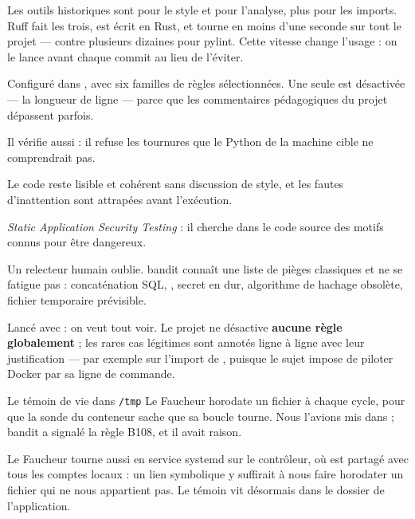 \pourquoi
Les outils historiques sont  pour le style et  pour
l'analyse, plus  pour les imports. Ruff fait les trois, est écrit en
Rust, et tourne en moins d'une seconde sur tout le projet --- contre plusieurs
dizaines pour pylint. Cette vitesse change l'usage : on le lance avant chaque
commit au lieu de l'éviter.

\role
Configuré dans , avec six familles de règles
sélectionnées. Une seule est désactivée --- la longueur de ligne --- parce que
les commentaires pédagogiques du projet dépassent parfois.

Il vérifie aussi  : il refuse les tournures que le
Python de la machine cible ne comprendrait pas.

\apport
Le code reste lisible et cohérent sans discussion de style, et les fautes
d'inattention sont attrapées avant l'exécution.


\quoi
\emph{Static Application Security Testing} : il cherche dans le code source des
motifs connus pour être dangereux.

\pourquoi
Un relecteur humain oublie. bandit connaît une liste de pièges classiques et ne
se fatigue pas : concaténation SQL, , secret en dur, algorithme
de hachage obsolète, fichier temporaire prévisible.

\role
Lancé avec  : on veut tout
voir. Le projet ne désactive \textbf{aucune règle globalement} ; les rares cas
légitimes sont annotés ligne à ligne avec leur justification --- par exemple
 sur l'import de , puisque le sujet impose de
piloter Docker par sa ligne de commande.

\begin{piege}{Le témoin de vie dans \texttt{/tmp}}
Le Faucheur horodate un fichier à chaque cycle, pour que la sonde du conteneur
sache que sa boucle tourne. Nous l'avions mis dans  ; bandit a
signalé la règle B108, et il avait raison.

Le Faucheur tourne aussi en service systemd sur le contrôleur, où  est
partagé avec tous les comptes locaux : un lien symbolique y suffirait à nous
faire horodater un fichier qui ne nous appartient pas. Le témoin vit désormais
dans le dossier de l'application.
\end{piege}

